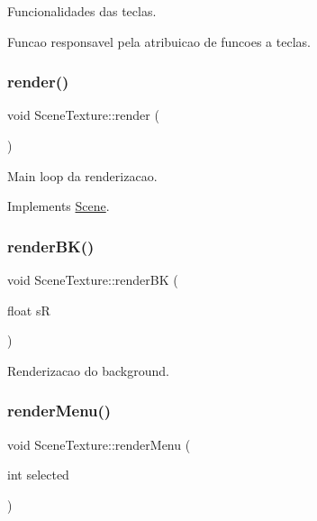 Funcionalidades das teclas. 

Funcao responsavel pela atribuicao de funcoes a teclas. \mbox{\label{class_scene_texture_ab988e3452c65e9b999a80764905159c4}} 
\subsubsection{\texorpdfstring{render()}{render()}}
{\footnotesize\ttfamily void Scene\+Texture\+::render (\begin{DoxyParamCaption}{ }\end{DoxyParamCaption})\hspace{0.3cm}{\ttfamily [virtual]}}



Main loop da renderizacao. 



Implements \mbox{\hyperlink{class_scene_a823f4cd60d27932ee16f74adb0421ff6}{Scene}}.

\mbox{\label{class_scene_texture_a45e23149cc3ff37694ee17daffa29a01}} 
\subsubsection{\texorpdfstring{renderBK()}{renderBK()}}
{\footnotesize\ttfamily void Scene\+Texture\+::render\+BK (\begin{DoxyParamCaption}\item[{float}]{sR }\end{DoxyParamCaption})}



Renderizacao do background. 

\mbox{\label{class_scene_texture_a195528c59a0cb7b6c1eeed33ca689208}} 
\subsubsection{\texorpdfstring{renderMenu()}{renderMenu()}}
{\footnotesize\ttfamily void Scene\+Texture\+::render\+Menu (\begin{DoxyParamCaption}\item[{int}]{selected }\end{DoxyParamCaption})}



